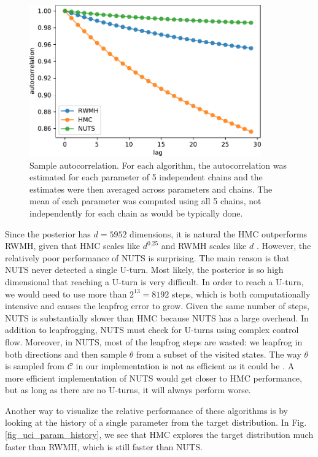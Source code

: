 \documentclass[12pt]{article}
\begin{document}
\begin{figure}[H]
\centering
\includegraphics[width=10cm]{plots/uci_param_autocor.pdf}
\caption{Sample autocorrelation. For each algorithm, the autocorrelation was estimated for each parameter of 5 independent chains and the estimates were then averaged across parameters and chains. The mean of each parameter was computed using all 5 chains, not independently for each chain as would be typically done.}
\label{fig_uci_param_autocor}
\end{figure}

Since the posterior has $d=5952$ dimensions, it is natural the HMC outperforms RWMH, given that HMC scales like $d^{0.25}$ and RWMH scales like $d$ \cite{hmc_rwmh_scaling}. However, the relatively poor performance of NUTS is surprising. The main reason is that NUTS never detected a single U-turn. Most likely, the posterior is so high dimensional that reaching a U-turn is very difficult. In order to reach a U-turn, we would need to use more than $2^{13} = 8192$ steps, which is both computationally intensive and causes the leapfrog error to grow. Given the same number of steps, NUTS is substantially slower than HMC because NUTS has a large overhead. In addition to leapfrogging, NUTS must check for U-turns using complex control flow. Moreover, in NUTS, most of the leapfrog steps are wasted: we leapfrog in both directions and then sample $\theta$ from a subset of the visited states. The way $\theta$ is sampled from $\mathcal{C}$ in our implementation is not as efficient as it could be \cite{nuts}. A more efficient implementation of NUTS would get closer to HMC performance, but as long as there are no U-turns, it will always perform worse.   

Another way to visualize the relative performance of these algorithms is by looking at the history of a single parameter from the target distribution. In Fig. \ref{fig_uci_param_history}, we see that HMC explores the target distribution much faster than RWMH, which is still faster than NUTS.
\end{document}
